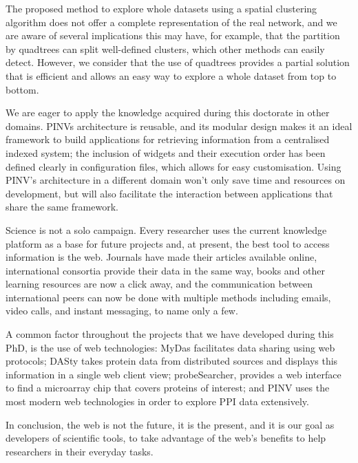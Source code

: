 The proposed method to explore whole datasets using a spatial clustering algorithm does not offer a complete representation of the real network, and we are aware of several implications this may have, for example, that the partition by quadtrees can split well-defined clusters, which other methods can easily detect. However, we consider that the use of quadtrees provides a partial solution that is efficient and allows an easy way to explore a whole dataset from top to bottom.

We are eager to apply the knowledge acquired during this doctorate in other domains. PINVs architecture is reusable, and its modular design makes it an ideal framework to build applications for retrieving information from a centralised indexed system; the inclusion of widgets and their execution order has been defined clearly in configuration files, which allows for easy customisation. Using PINV's architecture in a different domain won't only save time and resources on development, but will also facilitate the interaction between applications that share the same framework.

\vspace{5mm}

Science is not a solo campaign. Every researcher uses the current knowledge platform as a base for future projects and, at present, the best tool to access information is the web. Journals have made their articles available online, international consortia provide their data in the same way, books and other learning resources are now a click away, and the communication between international peers can now be done with multiple methods including emails, video calls, and instant messaging, to name only a few.

A common factor throughout the projects that we have developed during this PhD, is the use of web technologies: MyDas facilitates data sharing using web protocols; DASty takes protein data from distributed sources and displays this information in a single web client view; probeSearcher, provides a web interface to find a microarray chip that covers proteins of interest; and PINV uses the most modern web technologies in order to explore PPI data extensively. 

In conclusion, the web is not the future, it is the present, and it is our goal as developers of scientific tools, to take advantage of the web's benefits to help researchers in their everyday tasks.

